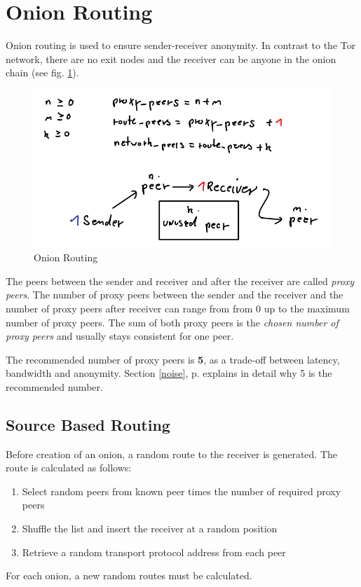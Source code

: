 \section{Onion Routing}
\label{onionrouting}
Onion routing is used to ensure sender-receiver anonymity. In contrast
to the Tor network, there are no exit nodes and the receiver can be anyone
in the onion chain (see fig. \ref{onionroutingimg}).
\begin{figure}
    \centering
    \caption{Onion Routing}
    \label{onionroutingimg}
    \includegraphics[scale=0.8]{onionrouting.png}
\end{figure}
The peers between the sender and receiver and after the receiver are
called \textit{proxy peers}. The number of proxy peers between the
sender and the receiver and the number of proxy peers after receiver
can range from from 0 up to the maximum number of proxy peers. The sum
of both proxy peers is the \textit{chosen number of proxy peers} and
usually stays consistent for one peer.

The recommended number of proxy peers is \textbf{5}, as a trade-off between
latency, bandwidth and anonymity. Section \ref{noise}, p. \pageref{noise}
explains in detail why 5 is the recommended number.
\subsection{Source Based Routing}
Before creation of an onion, a random route to the receiver is generated.
The route is calculated as follows:
\begin{enumerate}
\item Select random peers from known peer times the number of required proxy peers
\item Shuffle the list and insert the receiver at a random position
\item Retrieve a random transport protocol address from each peer
\end{enumerate}
For each onion, a new random routes must be calculated.
